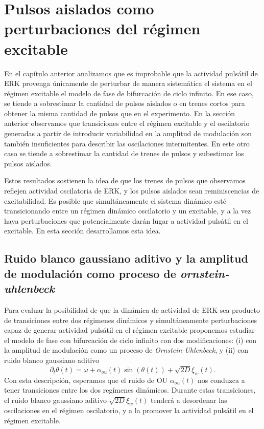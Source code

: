 \documentclass[./main.tex]{subfiles}
\begin{document}
\section{Pulsos aislados como perturbaciones del régimen excitable}
\label{C7_sec:OUD}


En el capítulo anterior analizamos que es improbable que la actividad pulsátil de ERK provenga únicamente de perturbar de manera sistemática el sistema en el régimen excitable el modelo de fase de bifurcación de ciclo infinito. En ese caso, se tiende a sobrestimar la cantidad de pulsos aislados o en trenes cortos para obtener la misma cantidad de pulsos que en el experimento. En la sección anterior observamos que transiciones entre el régimen excitable y el oscilatorio generadas a partir de introducir variabilidad en la amplitud de modulación son también insuficientes para describir las oscilaciones intermitentes. En este otro caso se tiende a sobrestimar la cantidad de trenes de pulsos y subestimar los pulsos aislados. 

Estos resultados sostienen la idea de que los trenes de pulsos que observamos reflejen actividad oscilatoria de ERK, y los pulsos aislados sean reminiscencias de excitabilidad. Es posible que simultáneamente el sistema dinámico esté transicionando entre un régimen dinámico oscilatorio y un excitable, y a la vez haya perturbaciones que potencialmente darán lugar a actividad pulsátil en el excitable. En esta sección desarrollamos esta idea.


\subsection{Ruido blanco gaussiano aditivo y la amplitud de modulación como proceso de \textit{ornstein-uhlenbeck}}

Para evaluar la posibilidad de que la dinámica de actividad de ERK sea producto de transiciones entre dos régimenes dinámicos y simultáneamente perturbaciones capaz de generar actividad pulsátil en el régimen excitable proponemos estudiar el modelo de fase con bifurcación de ciclo infinito con dos modificaciones: (i) con la amplitud de modulación como un proceso de \textit{Ornstein-Uhlenbeck}, y (ii) con ruido blanco gaussiano aditivo
\begin{equation}
    \partial_t  \theta(t) = \omega + \alpha_{ou}(t) \sin{(\theta(t))} + \sqrt{2D} \xi_w(t).
    \label{C7_eq:alpha_ou_D}
\end{equation}
Con esta descripción, esperamos que el ruido de OU $\alpha_{ou}(t)$ nos conduzca a tener transiciones entre los dos regímenes dinámicos. Durante estas transiciones, el ruido blanco gaussiano aditivo $\sqrt{2D} \xi_w(t)$ tenderá a desordenar las oscilaciones en el régimen oscilatorio, y a la promover la actividad pulsátil en el régimen excitable. 
\end{document}
